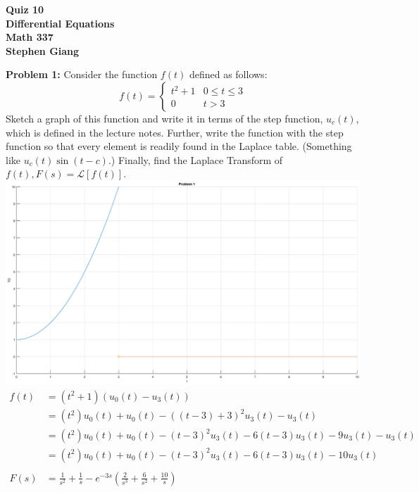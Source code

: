 \documentclass[12pt]{article}
\begin{document}
	
	\begin{center}
		\textbf{Quiz 10} \\
		\textbf{Differential Equations} \\
		\textbf{Math 337} \\
		\textbf{Stephen Giang} \\
	\end{center}

\noindent \textbf{Problem 1: } Consider the function $f(t)$ defined as follows:
	$$
	f(t) = 
	\begin{cases}
		t^2 + 1 & 0 \leq t \leq 3 \\
		0 & t > 3
	\end{cases}
	$$
Sketch a graph of this function and write it in terms of the step function, $u_c(t)$, which is defined in the lecture notes. Further, write the function with the step function so that every element is readily found in the Laplace table. (Something like $u_c(t) \sin(t - c)$.) Finally, find the Laplace Transform of $f(t), F(s) = \mathcal{L}[f(t)]$.
\\
\includegraphics[width=16cm]{Prob1}
	\begin{align*}
		f(t) &= (t^2 + 1)(u_0(t) - u_3(t)) \\
		&= (t^2)u_0(t) + u_0(t) - ((t-3) + 3)^2u_3(t) - u_3(t) \\
		&= (t^2)u_0(t) + u_0(t) - (t-3)^2u_3(t) - 6(t-3)u_3(t) - 9u_3(t) - u_3(t) \\
		&= (t^2)u_0(t) + u_0(t) - (t-3)^2u_3(t) - 6(t-3)u_3(t) - 10u_3(t)
		\\ \\
		F(s) &= \frac{1}{s^2} + \frac{1}{s} - e^{-3s}\left(\frac{2}{s^3} + \frac{6}{s^2} + \frac{10}{s} \right)
	\end{align*}

\newpage
\end{document}
